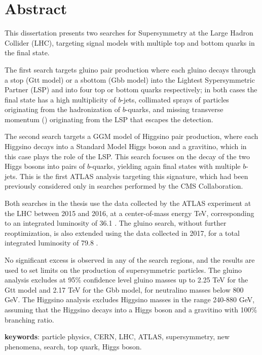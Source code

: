 \chapter*{Abstract}

This dissertation presents two searches for Supersymmetry at the Large Hadron Collider (LHC), targeting signal models with multiple top and bottom quarks in the final state.

The first search targets gluino pair production where each gluino decays through a stop
(Gtt model) or a sbottom (Gbb model) into the Lightest Sypersymmetric Partner (LSP) and into four top or bottom quarks respectively;
in both cases the final state has a high multiplicity of $b$-jets, collimated 
sprays of particles originating from the hadronization of $b$-quarks, and 
missing transverse momentum (\met) originating from the LSP  
that escapes the detection. 

The second search targets a GGM model of Higgsino pair production, 
where each Higgsino decays into a Standard Model Higgs boson and 
a gravitino, which in this case plays the role of the LSP. 
This search focuses on the decay of the two Higgs bosons into pairs of $b$-quarks, yielding again final states with multiple $b$-jets.
This is the first ATLAS analysis targeting this signature, which had been 
previously considered only in searches performed by the CMS Collaboration.

Both searches in the thesis use the data collected by the ATLAS experiment at the LHC 
between 2015 and 2016, at a center-of-mass energy  \cmtre TeV,
corresponding to an integrated luminosity of 36.1 \ifb.
The gluino search, without further reoptimization, is also extended using the data collected in 2017, 
for a total integrated luminosity of 79.8 \ifb.

No significant excess is observed in any of the search regions, 
and the results are used to 
set limits on the production of supersymmetric particles. 
The gluino analysis excludes at 95\% confidence level gluino masses up to 2.25 TeV for the Gtt model 
and 2.17 TeV for the Gbb model, for neutralino masses below 800 GeV.
The Higgsino analysis excludes Higgsino masses in the range 240-880 GeV, assuming 
that the Higgsino decays into a Higgs boson and a gravitino with 100\% branching ratio. 

\par\bigskip
\par\bigskip 
\par\bigskip

\noindent \textbf{keywords}: particle physics, CERN, LHC, ATLAS, supersymmetry, new phenomena, search, top quark, Higgs boson. 